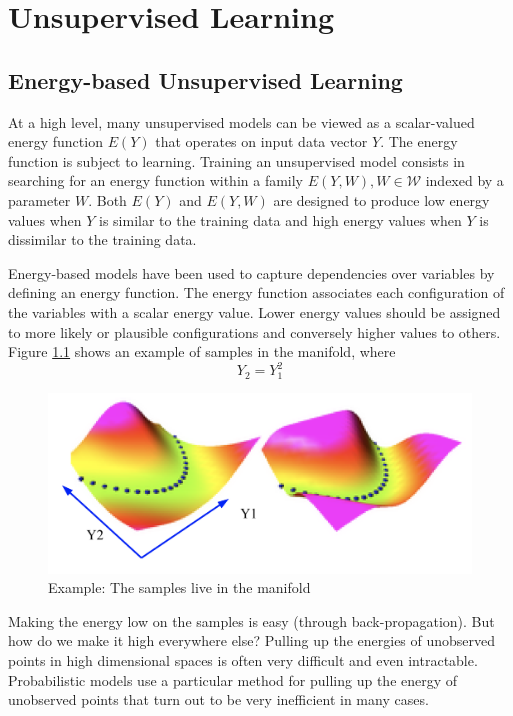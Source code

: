 \chapter{Unsupervised Learning}

\section{Energy-based Unsupervised Learning}

At a high level, many unsupervised models can be viewed as a scalar-valued energy function $E(Y)$ that operates on input data vector $Y$.
The energy function is subject to learning.
Training an unsupervised model consists in searching for an energy function within a family ${E(Y, W), W \in \mathcal{W}}$ indexed by a parameter $W$.
Both $E(Y)$ and $E(Y, W)$  are designed to produce low energy values when $Y$ is similar to the training data and high energy values when $Y$ is dissimilar to the training data.

Energy-based models have been used to capture dependencies over variables by defining an energy function.
The energy function associates each configuration of the variables with a scalar energy value. 
Lower energy values should be assigned to more likely or plausible configurations and conversely higher values to others. Figure \ref{figure1} shows an example of samples in the manifold, where 
\begin{equation}
    Y_2 = Y_1^2
\end{equation}
\begin{figure}[H]
        \centering
        \includegraphics[width=\textwidth]{figs/pic2.png}
        \caption{Example: The samples live in the manifold}
        \label{figure1}
    \end{figure}
Making the energy low on the samples is easy (through back-propagation). But how do we make it high everywhere else? Pulling up the energies of unobserved points in high dimensional spaces is often very difficult and even intractable. 
Probabilistic models use a particular method for pulling up the energy of unobserved points that turn out to be very inefficient in many cases.

